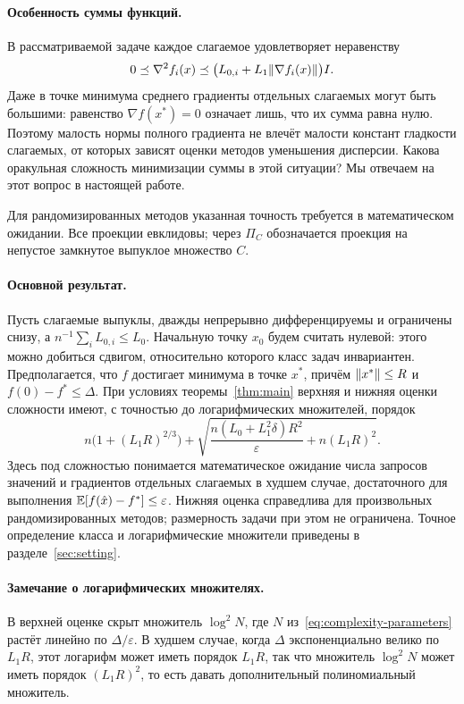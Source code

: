 \paragraph{Особенность суммы функций.}
В рассматриваемой задаче каждое слагаемое удовлетворяет неравенству
\[
 0\preceq\nabla^2f_i(x)
 \preceq\bigl(L_{0,i}+L_1\lVert\nabla f_i(x)\rVert\bigr)I.
\]
Даже в точке минимума среднего градиенты отдельных слагаемых могут быть
большими: равенство $\nabla f(x^\ast)=0$ означает лишь, что их сумма
равна нулю. Поэтому малость нормы полного градиента не влечёт малости
констант гладкости слагаемых, от которых зависят оценки методов уменьшения
дисперсии. Какова оракульная сложность минимизации суммы в этой ситуации?
Мы отвечаем на этот вопрос в настоящей работе.



Для рандомизированных методов указанная точность требуется
в математическом ожидании. Все проекции евклидовы; через $\Pi_C$
обозначается проекция на непустое замкнутое выпуклое множество $C$.

\paragraph{Основной результат.}
Пусть слагаемые выпуклы, дважды непрерывно дифференцируемы и ограничены
снизу, а $n^{-1}\sum_iL_{0,i}\le L_0$. Начальную точку $x_0$ будем считать
нулевой: этого можно добиться сдвигом, относительно которого класс
задач инвариантен. Предполагается, что $f$ достигает минимума в точке
$x^\ast$, причём $\lVert x^\ast\rVert\le R$ и $f(0)-f^\ast\le\Delta$.
При условиях теоремы~\ref{thm:main} верхняя и нижняя оценки сложности
имеют, с точностью до логарифмических множителей, порядок
\[
 n\bigl(1+(L_1R)^{2/3}\bigr)
 +\sqrt{\frac{n(L_0+L_1^2\delta)R^2}{\varepsilon}+n(L_1R)^2}.
\]
Здесь под сложностью понимается математическое ожидание числа запросов
значений и градиентов отдельных слагаемых в худшем случае,
достаточного для выполнения $\mathbb E[f(\hat x)-f^\ast]\le\varepsilon$.
Нижняя оценка справедлива для произвольных рандомизированных методов;
размерность задачи при этом не ограничена.
Точное определение класса и логарифмические множители приведены
в разделе~\ref{sec:setting}.

\paragraph{Замечание о логарифмических множителях.}
В верхней оценке скрыт множитель $\log^2N$, где $N$
из~\eqref{eq:complexity-parameters} растёт линейно по $\Delta/\varepsilon$.
В худшем случае, когда $\Delta$ экспоненциально велико по $L_1R$,
этот логарифм может иметь порядок $L_1R$, так что множитель $\log^2N$ может иметь порядок $(L_1R)^2$,
то есть давать дополнительный полиномиальный множитель.

